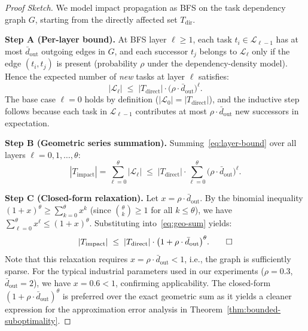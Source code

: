 \documentclass[manuscript,screen,review]{acmart}
\begin{document}
\begin{proof}[Proof Sketch]
We model impact propagation as BFS on the task dependency graph $G$,
starting from the directly affected set $T_{\mathrm{dir}}$.

\textbf{Step A (Per-layer bound).}
At BFS layer $\ell \geq 1$, each task $t_i \in \mathcal{L}_{\ell-1}$ has
at most $\bar{d}_{\mathrm{out}}$ outgoing edges in $G$, and each successor
$t_j$ belongs to $\mathcal{L}_\ell$ only if the edge $(t_i, t_j)$ is
present (probability $\rho$ under the dependency-density model).
Hence the expected number of \emph{new} tasks at layer $\ell$ satisfies:
\begin{equation}
|\mathcal{L}_\ell| \;\leq\; |T_{\mathrm{direct}}| \cdot
\bigl(\rho \cdot \bar{d}_{\mathrm{out}}\bigr)^{\ell}.
\label{eq:layer-bound}
\end{equation}
The base case $\ell = 0$ holds by definition
($|\mathcal{L}_0| = |T_{\mathrm{direct}}|$), and the inductive step follows
because each task in $\mathcal{L}_{\ell-1}$ contributes at most
$\rho \cdot \bar{d}_{\mathrm{out}}$ new successors in expectation.

\textbf{Step B (Geometric series summation).}
Summing~\eqref{eq:layer-bound} over all layers $\ell = 0, 1, \ldots, \theta$:
\begin{equation}
|T_{\mathrm{impact}}|
= \sum_{\ell=0}^{\theta} |\mathcal{L}_\ell|
\;\leq\; |T_{\mathrm{direct}}| \cdot \sum_{\ell=0}^{\theta}
\bigl(\rho \cdot \bar{d}_{\mathrm{out}}\bigr)^{\ell}.
\label{eq:geo-sum}
\end{equation}

\textbf{Step C (Closed-form relaxation).}
Let $x = \rho \cdot \bar{d}_{\mathrm{out}}$.
By the binomial inequality $(1+x)^{\theta} \geq \sum_{k=0}^{\theta} x^k$
(since $\binom{\theta}{k} \geq 1$ for all $k \leq \theta$), we have
$\sum_{\ell=0}^{\theta} x^{\ell} \leq (1+x)^{\theta}$.
Substituting into~\eqref{eq:geo-sum} yields:
\begin{equation}
|T_{\mathrm{impact}}|
\;\leq\; |T_{\mathrm{direct}}| \cdot
\bigl(1 + \rho \cdot \bar{d}_{\mathrm{out}}\bigr)^{\theta}. \qed
\end{equation}%
Note that this relaxation requires $x = \rho \cdot \bar{d}_{\mathrm{out}} < 1$,
i.e., the graph is sufficiently sparse. For the typical industrial parameters
used in our experiments ($\rho = 0.3$, $\bar{d}_{\mathrm{out}} = 2$),
we have $x = 0.6 < 1$, confirming applicability. The closed-form
$(1 + \rho \cdot \bar{d}_{\mathrm{out}})^{\theta}$ is preferred over the
exact geometric sum as it yields a cleaner expression for the approximation
error analysis in Theorem~\ref{thm:bounded-suboptimality}.
\end{proof}
\end{document}
